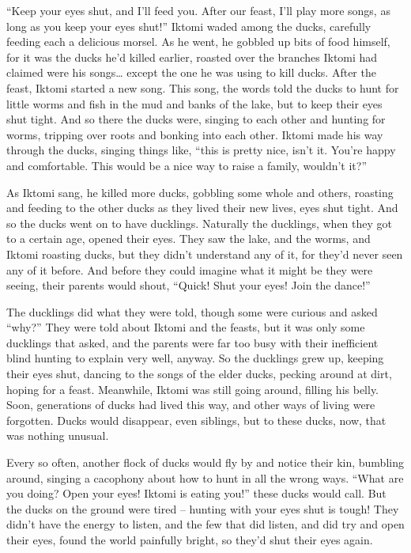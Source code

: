 \documentclass[11pt]{article}
\begin{document}
\begin{itemize}
\begin{itemize}
“Keep your eyes shut, and I’ll feed you. After our feast, I’ll play more songs, as long as you keep your eyes shut!” Iktomi waded among the ducks, carefully feeding each a delicious morsel. As he went, he gobbled up bits of food himself, for it was the ducks he’d killed earlier, roasted over the branches Iktomi had claimed were his songs… except the one he was using to kill ducks. After the feast, Iktomi started a new song. This song, the words told the ducks to hunt for little worms and fish in the mud and banks of the lake, but to keep their eyes shut tight. And so there the ducks were, singing to each other and hunting for worms, tripping over roots and bonking into each other. Iktomi made his way through the ducks, singing things like, “this is pretty nice, isn’t it. You’re happy and comfortable. This would be a nice way to raise a family, wouldn’t it?”

As Iktomi sang, he killed more ducks, gobbling some whole and others, roasting and feeding to the other ducks as they lived their new lives, eyes shut tight. And so the ducks went on to have ducklings. Naturally the ducklings, when they got to a certain age, opened their eyes. They saw the lake, and the worms, and Iktomi roasting ducks, but they didn’t understand any of it, for they’d never seen any of it before. And before they could imagine what it might be they were seeing, their parents would shout, “Quick! Shut your eyes! Join the dance!”

The ducklings did what they were told, though some were curious and asked “why?” They were told about Iktomi and the feasts, but it was only some ducklings that asked, and the parents were far too busy with their inefficient blind hunting to explain very well, anyway. So the ducklings grew up, keeping their eyes shut, dancing to the songs of the elder ducks, pecking around at dirt, hoping for a feast. Meanwhile, Iktomi was still going around, filling his belly. Soon, generations of ducks had lived this way, and other ways of living were forgotten. Ducks would disappear, even siblings, but to these ducks, now, that was nothing unusual.

Every so often, another flock of ducks would fly by and notice their kin, bumbling around, singing a cacophony about how to hunt in all the wrong ways. “What are you doing? Open your eyes! Iktomi is eating you!” these ducks would call. But the ducks on the ground were tired – hunting with your eyes shut is tough! They didn’t have the energy to listen, and the few that did listen, and did try and open their eyes, found the world painfully bright, so they’d shut their eyes again.


\end{itemize}
\end{itemize}
\end{document}
